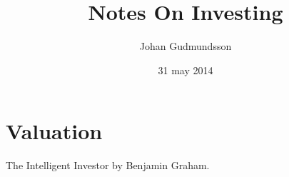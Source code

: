 \documentclass[12pt,a4paper]{report}
\title{Notes On Investing}
\author{Johan Gudmundsson}
\date{31 may 2014}
\begin{document}
\maketitle

\tableofcontents
\newpage 

\chapter{Valuation}

The Intelligent Investor by Benjamin Graham.\cite{test}



\end{document}
